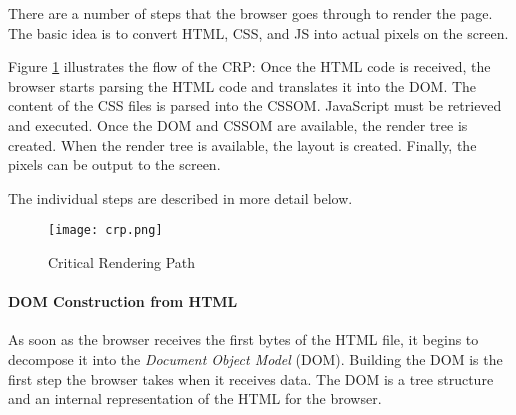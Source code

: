 

There are a number of steps that the browser goes through to render the page.
The basic idea is to convert HTML, CSS, and JS into actual pixels on the screen.

Figure \ref{img:crp} illustrates the flow of the CRP:
Once the HTML code is received, the browser starts parsing the HTML code and translates it into the DOM.
The content of the CSS files is parsed into the CSSOM.
JavaScript must be retrieved and executed.
Once the DOM and CSSOM are available, the render tree is created.
When the render tree is available, the layout is created.
Finally, the pixels can be output to the screen.

The individual steps are described in more detail below.


\begin{figure}[h!]
\begin{center}
\texttt{[image: crp.png]}
\caption{Critical Rendering Path}
\label{img:crp}
\end{center}
\end{figure}






\paragraph{DOM Construction from HTML} %


As soon as the browser receives the first bytes of the HTML file, it begins to decompose it into the \textit{Document Object Model} (DOM).
Building the DOM is the first step the browser takes when it receives data.
The DOM is a tree structure and an internal representation of the HTML for the browser. %

